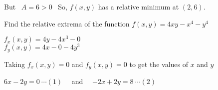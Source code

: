 \documentclass[12pt]{article}
\begin{document}
But \ $A=6>0$ \ So, $f(x, y)$ has a relative minimum at $(2,6)$.


\pagebreak
\textbf{\mred{\#}} Find the relative extrema of the function
$f(x, y)=4 x y-x^4-y^4$

\begin{minipage}[t]{0.39\linewidth}
\noindent
   $f_x(x,y) = 4 y-4 x^3-0$\\
   $f_y(x,y) = 4 x-0-4 y^3$
\end{minipage}\hspace{0.5ex}{\vrule width 1pt}\hspace{0.5ex}
\begin{minipage}[t]{0.59\linewidth}
\noindent
Taking $f_x(x, y)=0$ and $f_y(x, y)=0$ to get the values of $x$ and $y$

$6 x-2 y = 0 \ \cdots (1)$ \ \ and \ \ $-2 x+2 y = 8 \ \cdots (2)$
\end{minipage}
\end{document}
